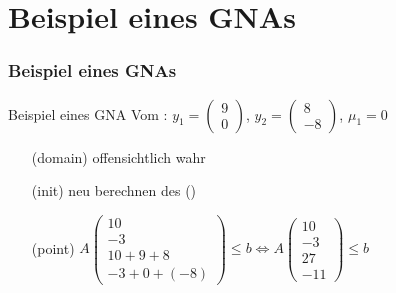 \section{Beispiel  eines GNAs}
\frame{\tableofcontents[currentsection]}
\begin{frame}
	\frametitle{\color{white}Beispiel  eines GNAs}
	\begin{exampleblock}{Beispiel eines GNA }
		Vom \solver: $y_1=\begin{pmatrix} 9 \\ 0 \end{pmatrix}$, $y_2=\begin{pmatrix} 8 \\ -8 \end{pmatrix}$, $\mu_1=0$\newline
		\vspace*{-.8em}
		\begin{itemize}
			\setlength{\itemindent}{1.5cm}
			\item[(domain)] offensichtlich wahr \checkmark
			\item[(init)] neu berechnen des \stem (\checkmark)
			\item[(point)]  $A\begin{pmatrix} 10 \\ -3 \\ 10+9+8 \\ -3 + 0 + (-8) \end{pmatrix} \le b \Leftrightarrow A\begin{pmatrix} 10 \\ -3 \\ 27 \\ -11 \end{pmatrix} \le b$ \checkmark
		\end{itemize}
	\end{exampleblock}
\end{frame}

